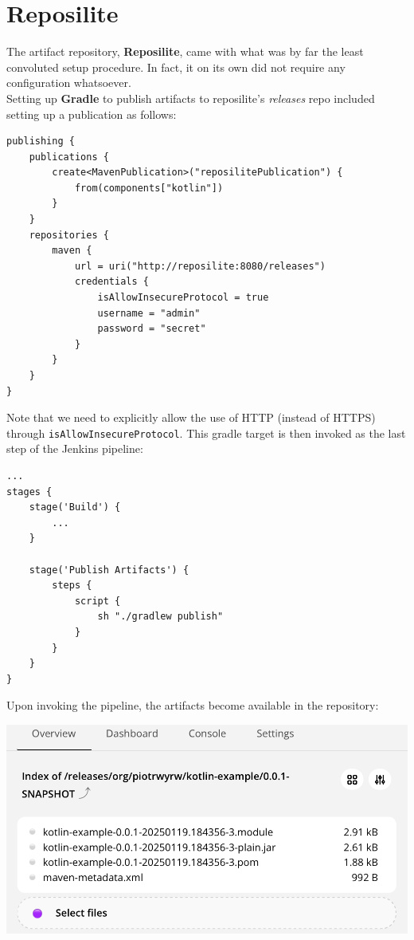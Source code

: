 \section{Reposilite}
The artifact repository, \textbf{Reposilite}, came with what was by far the least
convoluted setup procedure. In fact, it on its own did not require any configuration
whatsoever.\\
Setting up \textbf{Gradle} to publish artifacts to reposilite's \textit{releases} repo
included setting up a publication as follows:
\begin{lstlisting}
publishing {
    publications {
        create<MavenPublication>("reposilitePublication") {
            from(components["kotlin"])
        }
    }
    repositories {
        maven {
            url = uri("http://reposilite:8080/releases")
            credentials {
                isAllowInsecureProtocol = true
                username = "admin"
                password = "secret"
            }
        }
    }
}
\end{lstlisting}
Note that we need to explicitly allow the use of HTTP (instead of HTTPS) through \verb|isAllowInsecureProtocol|.
This gradle target is then invoked as the last step of the Jenkins pipeline:
\begin{lstlisting}
...
stages {
    stage('Build') {
        ...
    }

    stage('Publish Artifacts') {
        steps {
            script {
                sh "./gradlew publish"
            }
        }
    }
}
\end{lstlisting}
Upon invoking the pipeline, the artifacts become available in the repository:
\begin{center}
	\includegraphics[width=.75\textwidth]{assets/artifacts}
\end{center}
